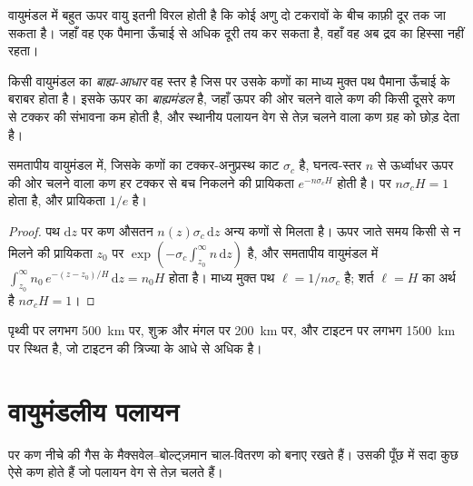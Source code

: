 वायुमंडल में बहुत ऊपर वायु इतनी विरल होती है कि कोई अणु
दो टकरावों के बीच काफ़ी दूर तक जा सकता है। जहाँ वह एक
पैमाना ऊँचाई से अधिक दूरी तय कर सकता है, वहाँ वह अब द्रव का हिस्सा नहीं रहता।

\begin{definition}[बाह्य-आधार; बाह्यमंडल]\label{def:b3:planetary-atmospheres:exobase}
किसी वायुमंडल का \emph{बाह्य-आधार} वह स्तर है जिस पर
उसके कणों का माध्य मुक्त पथ पैमाना ऊँचाई के बराबर होता है। इसके ऊपर का
\emph{बाह्यमंडल} है, जहाँ ऊपर की ओर चलने वाले कण की
किसी दूसरे कण से टक्कर की संभावना कम होती है, और स्थानीय पलायन वेग से
तेज़ चलने वाला कण ग्रह को छोड़ देता है।
\end{definition}

\begin{proposition}[बाह्य-आधार की शर्त]\label{prop:b3:planetary-atmospheres:exobase}
समतापीय वायुमंडल में, जिसके कणों का टक्कर-अनुप्रस्थ काट
$\sigma_c$ है, घनत्व-स्तर $n$ से ऊर्ध्वाधर ऊपर की ओर चलने वाला कण
हर टक्कर से बच निकलने की प्रायिकता $e^{-n\sigma_c H}$ होती है।
 पर $n\sigma_c H = 1$ होता है, और प्रायिकता $1/e$ है।
\end{proposition}

\begin{proof}
पथ $\mathrm dz$ पर कण औसतन $n(z)\sigma_c\,
\mathrm dz$ अन्य कणों से मिलता है। ऊपर जाते समय किसी से न मिलने की
प्रायिकता $z_0$ पर $\exp(-\sigma_c\int_{z_0}^\infty n\,\mathrm dz)$ है, और समतापीय
वायुमंडल में $\int_{z_0}^\infty n_0\,e^{-(z-z_0)/H}\,\mathrm dz
= n_0 H$ होता है। माध्य मुक्त पथ $\ell = 1/n\sigma_c$ है; शर्त $\ell
= H$ का अर्थ है $n\sigma_c H = 1$।
\end{proof}

 पृथ्वी पर लगभग \qty{500}{km} पर, शुक्र और मंगल पर
\qty{200}{km} पर, और टाइटन पर लगभग \qty{1500}{km} पर स्थित है, जो
टाइटन की त्रिज्या के आधे से अधिक है।

\section{वायुमंडलीय पलायन}\label{sec:b3:planetary-atmospheres:escape}

 पर कण नीचे की गैस के मैक्सवेल--बोल्ट्ज़मान
चाल-वितरण को बनाए रखते हैं। उसकी पूँछ में सदा कुछ ऐसे कण होते हैं जो
पलायन वेग से तेज़ चलते हैं।

